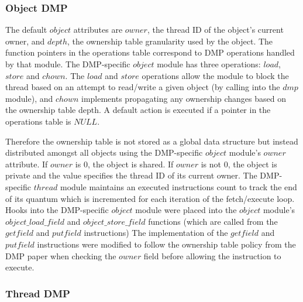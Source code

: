 \subsubsection{Object DMP}

The default $object$ attributes are $owner$, the thread ID of the
object's current owner, and $depth$, the ownership table granularity
used by the object.  The function pointers in the operations table
correspond to DMP operations handled by that module.  The DMP-specific
$object$ module has three operations: $load$, $store$ and $chown$.
The $load$ and $store$ operations allow the module to block the thread
based on an attempt to read/write a given object (by calling into the
$dmp$ module), and $chown$ implements propagating any ownership
changes based on the ownership table depth.  A default action is
executed if a pointer in the operations table is $NULL$.

Therefore the ownership table is not stored as a global data structure
but instead distributed amongst all objects using the DMP-specific
$object$ module's $owner$ attribute.  If $owner$ is $0$, the object is
shared.  If $owner$ is not $0$, the object is private and the value
specifies the thread ID of its current owner.  The DMP-specific
$thread$ module maintains an executed instructions count to track the
end of its quantum which is incremented for each iteration of the
fetch/execute loop.  Hooks into the DMP-specific $object$ module were
placed into the $object$ module's $object\_load\_field$ and
$object\_store\_field$ functions (which are called from the $getfield$
and $putfield$ instructions) The implementation of the $getfield$ and
$putfield$ instructions were modified to follow the ownership table
policy from the DMP paper when checking the $owner$ field before
allowing the instruction to execute.

\subsubsection{Thread DMP}

